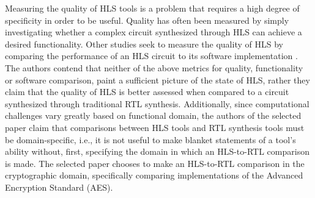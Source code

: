 \documentclass[11pt,journal,compsoc, onecolumn]{IEEEtran}
\begin{document}
Measuring the quality of HLS tools is a problem that requires a high degree of specificity in order to be useful. Quality has often been measured \cite{8}\cite{9}\cite{10}\cite{11}\cite{12} by simply investigating whether a complex circuit synthesized through HLS can achieve a desired functionality. Other studies \cite{3}\cite{4} seek to measure the quality of HLS by comparing the performance of an HLS circuit to its software implementation \cite{1}. The authors contend that neither of the above metrics for quality, functionality or software comparison, paint a sufficient picture of the state of HLS, rather they claim that the quality of HLS is better assessed when compared to a circuit synthesized through traditional RTL synthesis. Additionally, since computational challenges vary greatly based on functional domain, the authors of the selected paper claim that comparisons between HLS tools and RTL synthesis tools must be domain-specific, i.e., it is not useful to  make blanket statements of a tool's ability without, first, specifying the domain in which an HLS-to-RTL comparison is made. The selected paper chooses to make an HLS-to-RTL comparison in the cryptographic domain, specifically comparing implementations of the Advanced Encryption Standard (AES).
\end{document}
